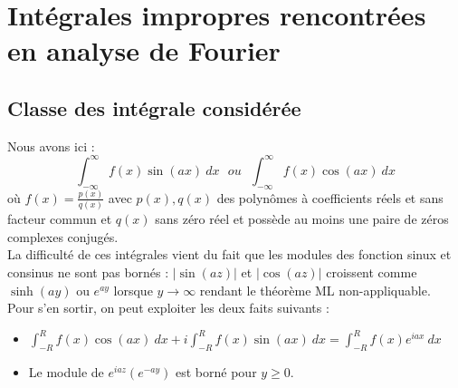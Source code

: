 	
\section{Intégrales impropres rencontrées en analyse de Fourier}
	\subsection{Classe des intégrale considérée}
	Nous avons ici : 
	\begin{equation}
	\int_{-\infty}^\infty f(x)\sin(ax)\ dx\ \ \ ou\ \ \ \int_{-\infty}^\infty f(x)\cos(ax)\ 
	dx
	\end{equation}
	où $f(x) = \frac{p(x)}{q(x)}$ avec $p(x),q(x)$ des polynômes à coefficients réels et 
	sans facteur commun et $q(x)$ sans zéro réel et possède au moins une paire de zéros 
	complexes conjugés.\\
	
	La difficulté de ces intégrales vient du fait que les modules des fonction sinux et 
	consinus ne sont pas bornés : $|\sin(az)|$ et $|\cos(az)|$ croissent comme $\sinh(ay)$
	ou $e^{ay}$ lorsque $y\rightarrow\infty$ rendant le théorème ML non-appliquable. \\
	Pour 
	s'en sortir, on peut exploiter les deux faits suivants :
	\begin{itemize}
	\item $\int_{-R}^R f(x)\cos(ax)\ dx + i\int_{-R}^R f(x)\sin(ax)\ dx = \int_{-R}^R f(x)
	e^{iax}\ dx$
	\item Le module de $e^{iaz}(e^{-ay})$ est borné pour $y\geq0$.
	\end{itemize}
	
